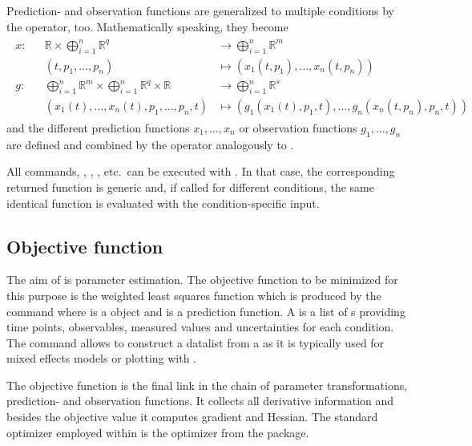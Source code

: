 \documentclass[article]{jss}
\begin{document}
Prediction- and observation functions are generalized to multiple conditions by the  operator, too. Mathematically speaking, they become
\begin{align*}
	\begin{aligned}
		x: &  & \mathbb R \times \bigoplus_{i = 1}^n \mathbb R^q & \longrightarrow  \bigoplus_{i = 1}^n \mathbb R^m \\
		 & & (t, p_1, \dots, p_n) & \longmapsto (x_1(t, p_1), \dots, x_n(t, p_n)) \\
		g: &  & \bigoplus_{i = 1}^n \mathbb R^m \times \bigoplus_{i = 1}^n \mathbb R^q\times \mathbb R& \longrightarrow  \bigoplus_{i = 1}^n \mathbb R^s \\
		& & (x_1(t), \dots, x_n(t), p_1, \dots, p_n, t) & \longmapsto (g_1(x_1(t), p_1, t), \dots, g_n(x_n(t, p_n), p_n, t)) 
	\end{aligned}
	\label{}
\end{align*}
and the different prediction functions $x_1, \dots, x_n$ or observation functions $g_1, \dots, g_n$ are defined and combined by the  operator analogously to .

All commands, , , , etc.~can be executed with . In that case, the corresponding returned function is generic and, if called for different conditions, the same identical function is evaluated with the condition-specific input. 

\subsection{Objective function}

The aim of  is parameter estimation. The objective function to be minimized for this purpose is the weighted least squares function which is produced by the command  where  is a  object and  is a prediction function. A  is a list of s providing time points, observables, measured values and uncertainties for each condition. The  command allows to construct a datalist from a  as it is typically used for mixed effects models or plotting with . 

The objective function is the final link in the chain of parameter transformations, prediction- and observation functions. It collects all derivative information and besides the objective value it computes gradient and Hessian. The standard optimizer employed within  is the  optimizer from the  package.
\end{document}
